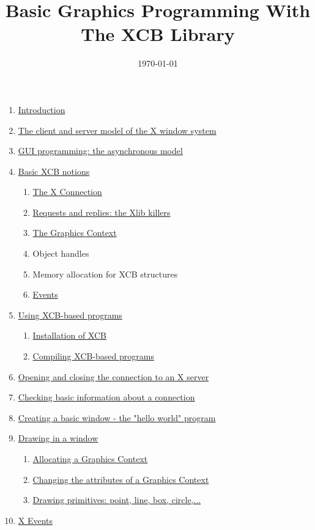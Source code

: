 \documentclass[12pt,oneside,titlepage]{book}
\title{Basic Graphics Programming With The XCB Library}
\author{}
\date{\today}
\providecommand{\tightlist}{%
  \setlength{\itemsep}{0pt}\setlength{\parskip}{0pt}}
\begin{document}
\maketitle

\begin{enumerate}
\tightlist
\item
  \protect\hyperlink{intro}{Introduction}
\item
  \protect\hyperlink{Xmodel}{The client and server model of the X window
  system}
\item
  \protect\hyperlink{asynch}{GUI programming: the asynchronous model}
\item
  \protect\hyperlink{notions}{Basic XCB notions}

  \begin{enumerate}
  \tightlist
  \item
    \protect\hyperlink{conn}{The X Connection}
  \item
    \protect\hyperlink{requestsreplies}{Requests and replies: the Xlib
    killers}
  \item
    \protect\hyperlink{gc}{The Graphics Context}
  \item
    Object handles
  \item
    Memory allocation for XCB structures
  \item
    \protect\hyperlink{events}{Events}
  \end{enumerate}
\item
  \protect\hyperlink{use}{Using XCB-based programs}

  \begin{enumerate}
  \tightlist
  \item
    \protect\hyperlink{inst}{Installation of XCB}
  \item
    \protect\hyperlink{comp}{Compiling XCB-based programs}
  \end{enumerate}
\item
  \protect\hyperlink{openconn}{Opening and closing the connection to an
  X server}
\item
  \protect\hyperlink{screen}{Checking basic information about a
  connection}
\item
  \protect\hyperlink{helloworld}{Creating a basic window - the "hello
  world" program}
\item
  \protect\hyperlink{drawing}{Drawing in a window}

  \begin{enumerate}
  \tightlist
  \item
    \protect\hyperlink{allocgc}{Allocating a Graphics Context}
  \item
    \protect\hyperlink{changegc}{Changing the attributes of a Graphics
    Context}
  \item
    \protect\hyperlink{drawingprim}{Drawing primitives: point, line,
    box, circle,...}
  \end{enumerate}
\item
  \protect\hyperlink{xevents}{X Events}


\end{enumerate}
\end{document}
